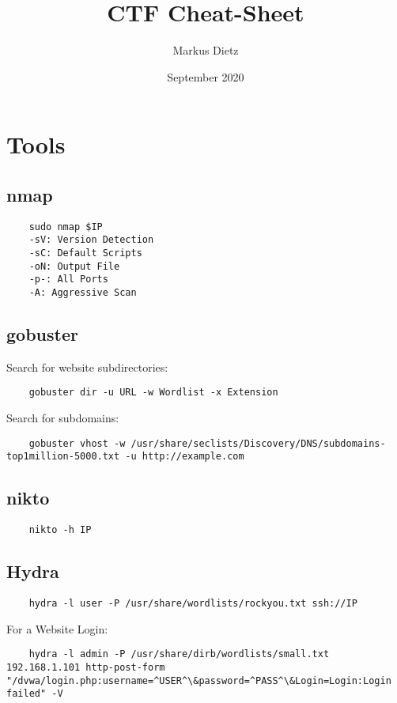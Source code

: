 \documentclass[12pt,a4paper]{scrartcl}
\title{CTF Cheat-Sheet}
\author{Markus Dietz}
\date{September 2020}
\begin{document}
\maketitle
\tableofcontents
\newpage
\section{Tools}
\subsection{nmap}
\begin{lstlisting}
	sudo nmap $IP
	-sV: Version Detection
	-sC: Default Scripts
	-oN: Output File
	-p-: All Ports
	-A: Aggressive Scan 
\end{lstlisting}

\subsection{gobuster}
Search for website subdirectories:
\begin{lstlisting}
	gobuster dir -u URL -w Wordlist -x Extension
\end{lstlisting}
Search for subdomains:
\begin{lstlisting}
	gobuster vhost -w /usr/share/seclists/Discovery/DNS/subdomains-top1million-5000.txt -u http://example.com
\end{lstlisting}

\subsection{nikto}
\begin{lstlisting}
	nikto -h IP
\end{lstlisting}

\subsection{Hydra}
\begin{lstlisting}
	hydra -l user -P /usr/share/wordlists/rockyou.txt ssh://IP
\end{lstlisting}
For a Website Login:
\begin{lstlisting}
	hydra -l admin -P /usr/share/dirb/wordlists/small.txt 192.168.1.101 http-post-form "/dvwa/login.php:username=^USER^\&password=^PASS^\&Login=Login:Login failed" -V
\end{lstlisting}
\end{document}
